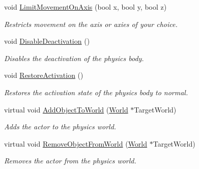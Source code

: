 \begin{DoxyCompactItemize}
void \hyperlink{classphys_1_1ActorRigid_adaed962ee8ed788612e541fb00867c78}{LimitMovementOnAxis} (bool x, bool y, bool z)
\begin{DoxyCompactList}\small\item\em Restricts movement on the axis or axies of your choice. \item\end{DoxyCompactList}\item 
void \hyperlink{classphys_1_1ActorRigid_ad74da4da12bbb44b3e5ae22007c98573}{DisableDeactivation} ()
\begin{DoxyCompactList}\small\item\em Disables the deactivation of the physics body. \item\end{DoxyCompactList}\item 
void \hyperlink{classphys_1_1ActorRigid_a99af341e186505a330f6634b7f6ad542}{RestoreActivation} ()
\begin{DoxyCompactList}\small\item\em Restores the activation state of the physics body to normal. \item\end{DoxyCompactList}\item 
virtual void \hyperlink{classphys_1_1ActorRigid_acaf29ca7058b39185dd09a5059200e91}{AddObjectToWorld} (\hyperlink{classphys_1_1World}{World} $\ast$TargetWorld)
\begin{DoxyCompactList}\small\item\em Adds the actor to the physics world. \item\end{DoxyCompactList}\item 
virtual void \hyperlink{classphys_1_1ActorRigid_a7101df2a149e0ccb3678b7c2c00998f8}{RemoveObjectFromWorld} (\hyperlink{classphys_1_1World}{World} $\ast$TargetWorld)
\begin{DoxyCompactList}\small\item\em Removes the actor from the physics world. \item\end{DoxyCompactList}\end{DoxyCompactItemize}
